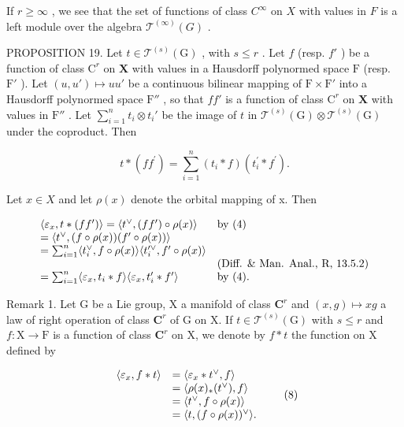 If \(r \geqslant \infty\) , we see that the set of functions of class \(C^\infty\) on \(X\) with values in \(F\) is a left module over the algebra \(\mathcal{T}^{(\infty)}(G)\) .

PROPOSITION 19. Let \(t \in \mathcal{T}^{(s)}(\mathrm{G})\) , with \(s \leqslant r\) . Let \(f\) (resp. \(f'\) ) be a function of class \(\mathrm{C}^r\) on \(\mathbf{X}\) with values in a Hausdorff polynormed space \(\mathrm{F}\) (resp. \(\mathrm{F}'\) ). Let \((u, u') \mapsto uu'\) be a continuous bilinear mapping of \(\mathrm{F} \times \mathrm{F}'\) into a Hausdorff polynormed space \(\mathrm{F}''\) , so that \(ff'\) is a function of class \(\mathrm{C}^r\) on \(\mathbf{X}\) with values in \(\mathrm{F}''\) . Let \(\sum_{i=1}^{n} t_i \otimes t_i'\) be the image of \(t\) in \(\mathcal{T}^{(s)}(\mathrm{G}) \otimes \mathcal{T}^{(s)}(\mathrm{G})\) under the coproduct. Then

\[
t * (f f ^ {\prime}) = \sum_ {i = 1} ^ {n} (t _ {i} * f) (t _ {i} ^ {\prime} * f ^ {\prime}).
\]

Let \(x \in X\) and let \(\rho(x)\) denote the orbital mapping of x. Then

\[
\begin{array}{l l} \langle \varepsilon_ {x}, t * (f f ^ {\prime}) \rangle = \langle t ^ {\vee}, (f f ^ {\prime}) \circ \rho (x) \rangle & \text {by (4)} \\ = \langle t ^ {\vee}, (f \circ \rho (x)) (f ^ {\prime} \circ \rho (x)) \rangle \\ = \sum_ {i = 1} ^ {n} \langle t _ {i} ^ {\vee}, f \circ \rho (x) \rangle \langle t _ {i} ^ {\prime \vee}, f ^ {\prime} \circ \rho (x) \rangle \\ & (\text {Diff. \& Man. Anal., R, 13.5.2}) \\ = \sum_ {i = 1} ^ {n} \langle \varepsilon_ {x}, t _ {i} * f \rangle \langle \varepsilon_ {x}, t _ {i} ^ {\prime} * f ^ {\prime} \rangle & \text {by (4).} \end{array}
\]

Remark 1. Let G be a Lie group, X a manifold of class \(\mathbf{C}^r\) and \((x,g)\mapsto xg\) a law of right operation of class \(\mathbf{C}^r\) of G on X. If \(t\in \mathcal{T}^{(s)}(\mathrm{G})\) with \(s\leqslant r\) and \(f\colon \mathrm{X}\to \mathrm{F}\) is a function of class \(\mathbf{C}^r\) on X, we denote by \(f*t\) the function on X defined by

\[
\begin{array}{r l} \langle \varepsilon_ {x}, f * t \rangle & = \langle \varepsilon_ {x} * t ^ {\vee}, f \rangle \\ & = \langle \rho (x) _ {*} (t ^ {\vee}), f \rangle \\ & = \langle t ^ {\vee}, f \circ \rho (x) \rangle \\ & = \langle t, (f \circ \rho (x)) ^ {\vee} \rangle . \end{array}\tag{8}
\]


